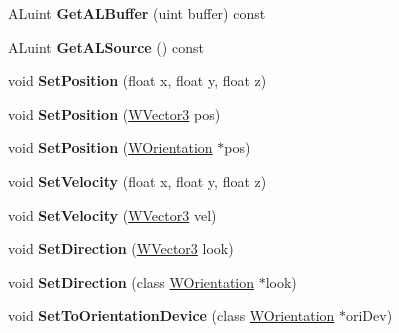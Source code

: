 \begin{DoxyCompactItemize}
\item 
A\+Luint {\bfseries Get\+A\+L\+Buffer} (uint buffer) const \hypertarget{class_w_sound_a43f837d0a73fa3bb723c89ac4d16d16d}{}\label{class_w_sound_a43f837d0a73fa3bb723c89ac4d16d16d}

\item 
A\+Luint {\bfseries Get\+A\+L\+Source} () const \hypertarget{class_w_sound_aeaf2f3def29fc8d28990a11275e57593}{}\label{class_w_sound_aeaf2f3def29fc8d28990a11275e57593}

\item 
void {\bfseries Set\+Position} (float x, float y, float z)\hypertarget{class_w_sound_a9216d41f6e76443f10bb3f45d3ad8d4e}{}\label{class_w_sound_a9216d41f6e76443f10bb3f45d3ad8d4e}

\item 
void {\bfseries Set\+Position} (\hyperlink{class_w_vector3}{W\+Vector3} pos)\hypertarget{class_w_sound_ac2f02231d582f103329a1b879237ebe0}{}\label{class_w_sound_ac2f02231d582f103329a1b879237ebe0}

\item 
void {\bfseries Set\+Position} (\hyperlink{class_w_orientation}{W\+Orientation} $\ast$pos)\hypertarget{class_w_sound_a29eae20e4815c225844ba6ab46bd1100}{}\label{class_w_sound_a29eae20e4815c225844ba6ab46bd1100}

\item 
void {\bfseries Set\+Velocity} (float x, float y, float z)\hypertarget{class_w_sound_a999cabacdbf22ba717a4c0d4e17b37a9}{}\label{class_w_sound_a999cabacdbf22ba717a4c0d4e17b37a9}

\item 
void {\bfseries Set\+Velocity} (\hyperlink{class_w_vector3}{W\+Vector3} vel)\hypertarget{class_w_sound_a908411268b52c3509731f748d89c1b4e}{}\label{class_w_sound_a908411268b52c3509731f748d89c1b4e}

\item 
void {\bfseries Set\+Direction} (\hyperlink{class_w_vector3}{W\+Vector3} look)\hypertarget{class_w_sound_adf0bd5f1ef76af7d3825fb09e85fa666}{}\label{class_w_sound_adf0bd5f1ef76af7d3825fb09e85fa666}

\item 
void {\bfseries Set\+Direction} (class \hyperlink{class_w_orientation}{W\+Orientation} $\ast$look)\hypertarget{class_w_sound_a0b529cb2804d002eff9232ecc29d995a}{}\label{class_w_sound_a0b529cb2804d002eff9232ecc29d995a}

\item 
void {\bfseries Set\+To\+Orientation\+Device} (class \hyperlink{class_w_orientation}{W\+Orientation} $\ast$ori\+Dev)\hypertarget{class_w_sound_a66715f35ef418b7df73483daa4c91a1b}{}\label{class_w_sound_a66715f35ef418b7df73483daa4c91a1b}

\end{DoxyCompactItemize}
